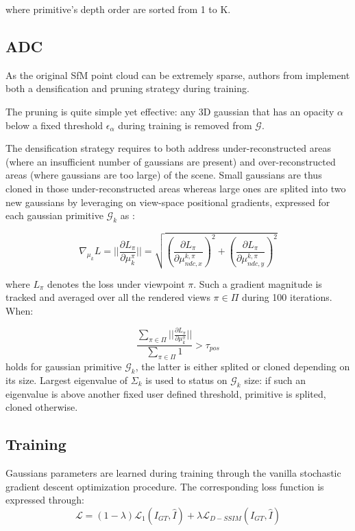 where primitive’s depth order are sorted from 1 to K. \newline

\subsection{ADC} 
As the original SfM point cloud can be extremely sparse, authors from \citep{kerbl20233d} implement both a densification and pruning strategy during training. 

The pruning is quite simple yet effective: any 3D gaussian that has an opacity $\alpha$ below a fixed threshold $\epsilon_{\alpha}$ during training is removed from $\mathcal{G}$. 

The densification strategy requires to both address under-reconstructed areas (where an insufficient number of gaussians are present) and over-reconstructed areas (where gaussians are too large) of the scene. Small gaussians are thus cloned in those under-reconstructed areas whereas large ones are splited into two new gaussians by leveraging on view-space positional gradients, expressed for each gaussian primitive $\mathcal{G}_{k}$ as : 

\begin{equation}
   \nabla_{\mu_{k}}L= ||\frac{\partial L_{\pi}}{\partial \mu_{k}^{\pi}}|| = \sqrt{\left(\frac{\partial L_{\pi}}{\partial \mu_{ndc,x}^{k,\pi}}\right)^{2} + \left(\frac{\partial L_{\pi}}{\partial \mu_{ndc,y}^{k,\pi}}\right)^{2}}
\end{equation}

where $L_{\pi}$ denotes the loss under viewpoint $\pi$. Such a gradient magnitude is tracked and averaged over all the rendered views $\pi \in \Pi$ during 100 iterations. When: 

\begin{equation}
\frac{\sum \limits_{\pi \in \Pi} ||\frac{\partial L_{\pi}}{\partial \mu_{k}^{\pi}}||}{\sum \limits_{\pi \in \Pi} 1} > \tau_{pos}
\label{eq:adc-original}
\end{equation}
holds for gaussian primitive $\mathcal{G}_{k}$, the latter is either splited or cloned depending on its size. Largest eigenvalue of $\Sigma_{k}$ is used to status on $\mathcal{G}_{k}$ size: if such an eigenvalue is above another fixed user defined threshold, primitive is splited, cloned otherwise. \newline

\subsection{Training} 
Gaussians parameters are learned during training through the vanilla stochastic gradient descent optimization procedure. The corresponding loss function is expressed through: 
\begin{equation}
    \mathcal{L} = (1-\lambda)\mathcal{L}_{1}(I_{GT},\hat{I}) + \lambda \mathcal{L}_{D-SSIM}(I_{GT},\hat{I})
\end{equation}

